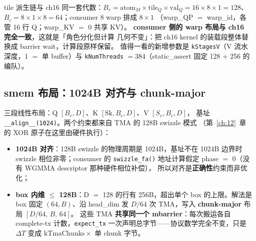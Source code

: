 

tile 派生链与 ch16 同一套代数：$B_r = \mathrm{atom}_M \times
\mathrm{tile}_Q \times \mathrm{val}_Q = 16 \times 8 \times 1 = 128$、
$B_c = 8 \times 1 \times 8 = 64$；consumer 8 warp 排成 $8 \times 1$
（warp\_QP $=$ warp\_id，各管 16 行 Q；warp\_KV $=$ 0 共享 KV）。
\textbf{consumer 侧的 warp 布局与 ch16 完全一致}，这就是「角色分化但计算
几何不变」：把 ch16 kernel 的装载段整体替换成 barrier wait，计算段原样保留。
值得一看的新增参数是 \texttt{kStagesV}（V 流水深度，1 $=$ 单 buffer）与
\texttt{kNumThreads} $= 384$（static\_assert 固定 128 $+$ 256 的编队）。

\subsection{smem 布局：1024B 对齐与 chunk-major}



三段线性布局：Q $[B_r, D]$、K $[\mathrm{Sk}, B_c, D]$、V $[S_v, B_c, D]$，
基址 \texttt{\_\allowbreak{}\_\allowbreak{}align\_\allowbreak{}\_\allowbreak{}(1024)}。两个约束都来自 TMA 的 128B swizzle 模式
（第~\ref{ch:12}~章的 XOR 原子在这里由硬件执行）：

\begin{itemize}
  \item \textbf{1024B 对齐}：128B swizzle 的物理周期是 1024B，基址不在
        1024B 边界时 swizzle 相位非零；consumer 的 \texttt{swizzle\_\allowbreak{}fa\allowbreak{}()}
        地址计算假定 phase $=$ 0（没有 WGMMA descriptor 那种硬件相位补偿），
        所以对齐是\textbf{正确性}约束而非优化；
  \item \textbf{box 内维 $\le$ 128B}：D $=$ 128 的行有 256B，超出单个
        box 的上限。解法是 box 固定 $(64, B)$、沿 head\_dim 发
        $D/64$ 次 TMA，写入 \textbf{chunk-major} 布局 $[D/64,\, B,\, 64]$。
        这些 TMA \textbf{共享同一个 mbarrier}：每次搬运各自 complete-tx
        计数，\texttt{expect\_tx} 一次声明总字节——协议数学完全不变，只是
        $\Delta T$ 变成 $\mathrm{kTmaChunks} \times$ 单 chunk 字节。
\end{itemize}

